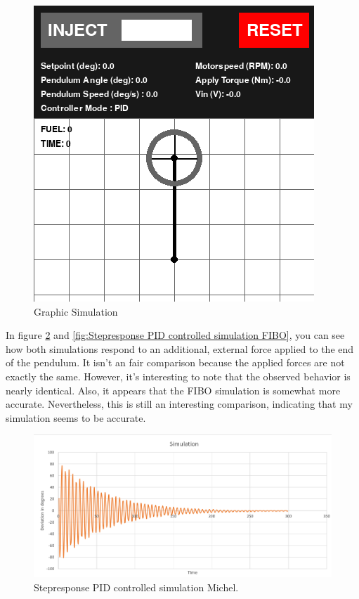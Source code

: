 \documentclass{article}
\begin{document}
\begin{multicols}{2}
\begin{figure}[H]
\centering
\includegraphics[scale=1.5]{simulatie foto}
\caption{Graphic Simulation}
\label{fig:Graphic Simulation}
\end{figure}

In figure \ref{fig:Stepresponse PID controlled simulation Michel} and \ref{fig:Stepresponse PID controlled simulation FIBO}, you can see how both simulations respond to an additional, external force applied to the end of the pendulum. It isn't an fair comparison because the applied forces are not exactly the same. However, it's interesting to note that the observed behavior is nearly identical. Also, it appears that the FIBO simulation is somewhat more accurate. Nevertheless, this is still an interesting comparison, indicating that my simulation seems to be accurate.

\begin{figure}[H]
\centering
\includegraphics[scale=0.37]{Stepresponse Michel}
\caption{Stepresponse PID controlled simulation Michel.}
\label{fig:Stepresponse PID controlled simulation Michel}
\end{figure}


\end{multicols}
\end{document}
